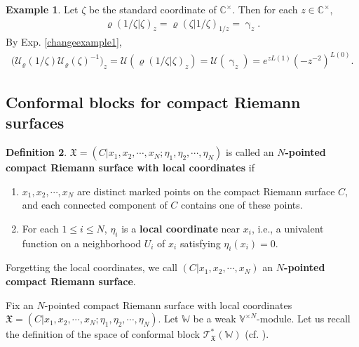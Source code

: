 \documentclass[11pt,b5paper,notitlepage]{article}
\theoremstyle{definition}
\newtheorem{df}{Definition}[section]
\newtheorem{eg}[df]{Example}
\theoremstyle{plain}
\newcommand{\Vbb}{\mathbb V}
\newcommand{\Wbb}{\mathbb W}
\newcommand{\Cbb}{\mathbb C}
\newcommand{\<}{\left\langle}
\renewcommand{\>}{\right\rangle}
\newcommand{\MU}{\mathcal{U}}
\newcommand{\fx}{\mathfrak{X}}
\newcommand{\ST}{\mathscr{T}}
\numberwithin{equation}{section}
\begin{document}
\begin{eg}\label{lb60}
    Let $\zeta$ be the standard coordinate of $\Cbb^\times$. Then for each $z\in \Cbb^\times$, 
    \begin{align*}
        \varrho(1/\zeta\vert \zeta)_z=\varrho(\zeta\vert 1/\zeta)_{1/z}=\upgamma_z.
    \end{align*}
    By Exp. \ref{changeexample1}, 
    \begin{align*}
       \big( \MU_\varrho(1/\zeta)\MU_\varrho(\zeta)^{-1}\big)_z=\MU(\varrho(1/\zeta\vert \zeta)_z)=\MU(\upgamma_z)=e^{z L(1)}(-z^{-2})^{L(0)}.
    \end{align*}
\end{eg}
\subsection{Conformal blocks for compact Riemann surfaces}
\begin{df}
$\fx=(C\big| x_1,x_2,\cdots,x_N;\eta_1,\eta_2,\cdots,\eta_N)$ is called an \textbf{$N$-pointed compact Riemann surface with local coordinates} if 
\begin{enumerate}[label=(\arabic*)]
    \item $x_1,x_2,\cdots,x_N$ are distinct marked points on the compact Riemann surface $C$, and each connected component of $C$ contains one of these points.
    \item For each $1\leq i\leq N$, $\eta_i$ is a \textbf{local coordinate}  near $x_i$, i.e., a univalent function on a neighborhood $U_i$ of $x_i$ satisfying $\eta_i(x_i)=0$.
\end{enumerate}
Forgetting the local coordinates, we call $(C\big| x_1,x_2,\cdots,x_N)$ an \textbf{$N$-pointed compact Riemann surface}.
\end{df}
Fix an $N$-pointed compact Riemann surface with local coordinates $\fx=(C\big| x_1,x_2,\cdots,x_N;\eta_1,\eta_2,\cdots,\eta_N)$. Let $\Wbb$ be a weak $\Vbb^{\times N}$-module. Let us recall the definition of the space of conformal block $\ST_\fx^*(\Wbb)$ (cf. \cite[Ch. 9]{FB04}).
\end{document}
